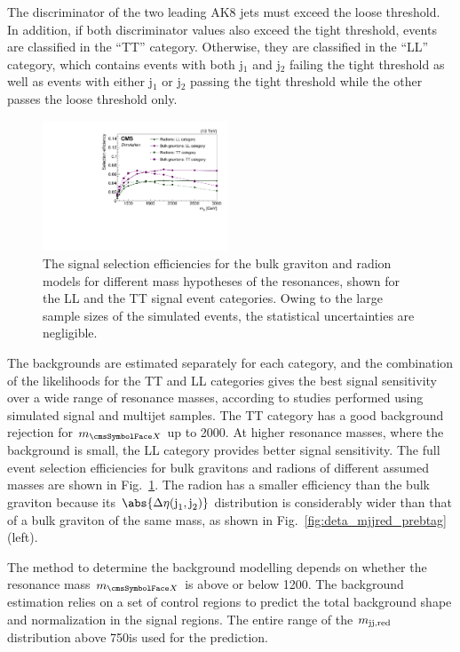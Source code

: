 The \Hbbt discriminator of the two leading AK8 jets must exceed the
loose threshold. In addition, if both discriminator values also exceed the tight threshold, events are classified in the ``TT'' category. Otherwise, they are classified in the ``LL'' category, which contains events with both j$_{1}$ and j$_{2}$ failing the tight threshold as well as events with either j$_{1}$ or j$_{2}$ passing the tight threshold while the other passes the loose threshold only.

\begin{figure}[htb]
\centering
\includegraphics[width=0.49\textwidth]{B2G-16-026/Figure_003.pdf}
\caption{The signal selection efficiencies for the bulk graviton and
  radion models for different mass hypotheses of the resonances, shown
  for the LL and the TT signal event categories. Owing to the large sample sizes of the simulated events, the statistical uncertainties are negligible.}
\label{fig:SignalEff}
\end{figure}

The backgrounds are estimated separately for each category, and the
combination of the likelihoods for the TT and LL categories gives
the best signal sensitivity over a wide range of resonance masses, according to studies performed using
simulated signal and multijet samples. The TT category has
a good background rejection for $\mx$ up to 2000\GeV. At higher
resonance masses,
where the background is small, the LL category provides better
signal sensitivity. The full event selection efficiencies for bulk
gravitons and radions of different assumed masses are shown in
Fig.~\ref{fig:SignalEff}. The radion has a smaller efficiency than the
bulk graviton because its $\abs{\DeltaEta}$ distribution is
considerably wider than that of a bulk graviton of the same mass, as
shown in Fig.~\ref{fig:deta_mjjred_prebtag} (left).

The method to determine the background modelling depends on whether the resonance mass $\mx$ is above or below 1200\GeV.
The background estimation relies on a set of control regions to predict the total background shape and normalization in the signal regions.
The entire range of the $m_{\text{jj,red}}$ distribution above 750\GeV is used for the prediction.

